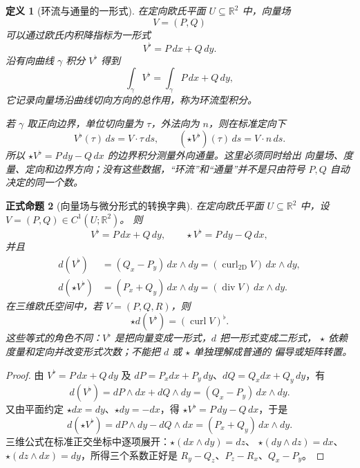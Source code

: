 \documentclass[UTF8,fontset=none,a4paper,11pt]{ctexart}
\theoremstyle{foundation-definition}
\newtheorem{definition}{定义}[section]
\theoremstyle{foundation-theorem}
\theoremstyle{foundation-proposition}
\newtheorem{proposition}[definition]{正式命题}
\theoremstyle{foundation-example}
\theoremstyle{foundation-remark}
\theoremstyle{foundation-theorem}
\begin{document}
\begin{definition}[环流与通量的一形式]\label{def:circulation-flux}
在定向欧氏平面 \(U\subseteq\mathbb R^2\) 中，向量场
\[
V=(P,Q)
\]
可以通过欧氏内积降指标为一形式
\[
V^\flat=P\,dx+Q\,dy.
\]
沿有向曲线 \(\gamma\) 积分 \(V^\flat\) 得到
\[
\int_\gamma V^\flat=\int_\gamma P\,dx+Q\,dy,
\]
它记录向量场沿曲线切向方向的总作用，称为环流型积分。

若 \(\gamma\) 取正向边界，单位切向量为 \(\tau\)，外法向为 \(n\)，则在标准定向下
\[
V^\flat(\tau)\,ds=V\cdot\tau\,ds,\qquad
(\star V^\flat)(\tau)\,ds=V\cdot n\,ds.
\]
所以 \(\star V^\flat=P\,dy-Q\,dx\) 的边界积分测量外向通量。这里必须同时给出
向量场、度量、定向和边界方向；没有这些数据，“环流”和“通量”并不是只由符号
\(P,Q\) 自动决定的同一个数。
\end{definition}

\begin{proposition}[向量场与微分形式的转换字典]\label{prop:vector-form-dictionary}
在定向欧氏平面 \(U\subseteq\mathbb R^2\) 中，设 \(V=(P,Q)\in C^1(U;\mathbb R^2)\)。
则
\[
V^\flat=P\,dx+Q\,dy,\qquad
\star V^\flat=P\,dy-Q\,dx,
\]
并且
\[
\begin{aligned}
d(V^\flat)&=(Q_x-P_y)\,dx\wedge dy
          =(\operatorname{curl}_{2\mathrm D}V)\,dx\wedge dy,\\
d(\star V^\flat)&=(P_x+Q_y)\,dx\wedge dy
          =(\operatorname{div}V)\,dx\wedge dy.
\end{aligned}
\]
在三维欧氏空间中，若 \(V=(P,Q,R)\)，则
\[
\star d(V^\flat)=(\operatorname{curl}V)^\flat.
\]
这些等式的角色不同：\(V^\flat\) 是把向量变成一形式，\(d\) 把一形式变成二形式，
\(\star\) 依赖度量和定向并改变形式次数；不能把 \(d\) 或 \(\star\) 单独理解成普通的
偏导或矩阵转置。
\end{proposition}

\begin{proof}
由 \(V^\flat=P\,dx+Q\,dy\) 及
\(dP=P_xdx+P_y\,dy\)、\(dQ=Q_xdx+Q_y\,dy\)，有
\[
d(V^\flat)
=dP\wedge dx+dQ\wedge dy
=(Q_x-P_y)\,dx\wedge dy.
\]
又由平面约定 \(\star dx=dy\)、\(\star dy=-dx\)，得
\(\star V^\flat=P\,dy-Q\,dx\)，于是
\[
d(\star V^\flat)
=dP\wedge dy-dQ\wedge dx
=(P_x+Q_y)\,dx\wedge dy.
\]
三维公式在标准正交坐标中逐项展开：\(\star(dx\wedge dy)=dz\)、
\(\star(dy\wedge dz)=dx\)、\(\star(dz\wedge dx)=dy\)，所得三个系数正好是
\(R_y-Q_z\)、\(P_z-R_x\)、\(Q_x-P_y\)。
\end{proof}
\end{document}
